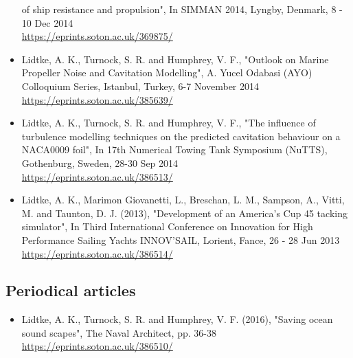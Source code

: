 \documentclass[a4paper,10pt]{article}
\begin{document}
\begin{itemize}
	of ship resistance and propulsion", In SIMMAN 2014, Lyngby, Denmark, 8 - 10 Dec 2014
	\cite{Badoe2014}
	\\ \url{https://eprints.soton.ac.uk/369875/}
%
\item Lidtke, A. K., Turnock, S. R. and Humphrey, V. F., "Outlook on Marine Propeller
	Noise and Cavitation Modelling", A. Yucel Odabasi (AYO) Colloquium Series, Istanbul,
	Turkey, 6-7 November 2014
	\cite{Lidtke2014a}
	\\ \url{https://eprints.soton.ac.uk/385639/}
%
\item Lidtke, A. K., Turnock, S. R. and Humphrey, V. F., "The influence of turbulence
	modelling techniques on the predicted cavitation behaviour on a NACA0009 foil",
	In 17th Numerical Towing Tank Symposium (NuTTS), Gothenburg, Sweden, 28-30 Sep 2014
	\cite{Lidtke2014}
	\\ \url{https://eprints.soton.ac.uk/386513/}
%
\item Lidtke, A. K., Marimon Giovanetti, L., Breschan, L. M., Sampson, A., Vitti, M.
	and Taunton, D. J. (2013), "Development of an America's Cup 45 tacking simulator",
	In Third International Conference on Innovation for High Performance Sailing
	Yachts INNOV’SAIL, Lorient, Fance, 26 - 28 Jun 2013
	\cite{Lidtke2013}
	\\ \url{https://eprints.soton.ac.uk/386514/}
%
\end{itemize}

\subsection{Periodical articles}
%
\begin{itemize}
\item Lidtke, A. K., Turnock, S. R. and Humphrey, V. F. (2016), "Saving ocean sound
	scapes", The Naval Architect, pp. 36-38
	\cite{Lidtke2016c}
	\\ \url{https://eprints.soton.ac.uk/386510/}
%
\end{itemize}

\end{document}
